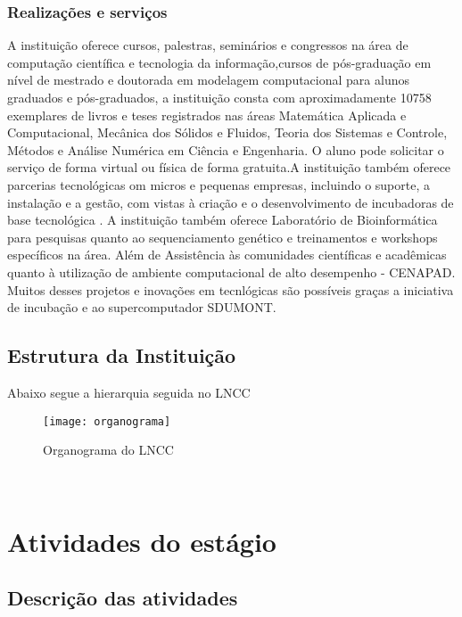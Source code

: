\documentclass[11pt,a4paper]{article}
\begin{document}
\subsubsection{Realizações e serviços}
\hspace{1.5cm}A instituição oferece cursos, palestras, seminários e congressos na área de computação científica e tecnologia da informação,cursos de pós-graduação em nível de mestrado e doutorada em modelagem computacional para alunos graduados e pós-graduados, a instituição consta com aproximadamente 10758 exemplares de livros e teses registrados nas áreas Matemática Aplicada e Computacional, Mecânica 
dos Sólidos e Fluidos, Teoria dos Sistemas e Controle, Métodos e Análise Numérica em Ciência e Engenharia. O aluno pode solicitar o serviço de forma virtual ou física de forma gratuita.A instituição também oferece parcerias tecnológicas 
om   micros   e   pequenas   empresas,   incluindo   o
suporte, a instalação e a gestão, com vistas à criação e o desenvolvimento de
incubadoras de base tecnológica . A instituição também oferece Laboratório de  Bioinformática para pesquisas quanto ao sequenciamento
genético e treinamentos e 
workshops
 específicos na área. Além de Assistência às comunidades científicas e acadêmicas quanto à utilização de
ambiente computacional de alto desempenho - CENAPAD.\\
Muitos desses projetos e inovações em tecnlógicas são possíveis graças a iniciativa de incubação e ao supercomputador SDUMONT.
\subsection{Estrutura da Instituição}
\hspace{1.5cm}Abaixo segue a hierarquia seguida no LNCC
\begin{figure}[!htb]
\begin{center}
\texttt{[image: organograma]}\\
\caption{Organograma do LNCC}
\end{center}
\end{figure}\\
\vfill
\newpage
\section{Atividades do estágio}
\subsection{Descrição das atividades}
\end{document}
